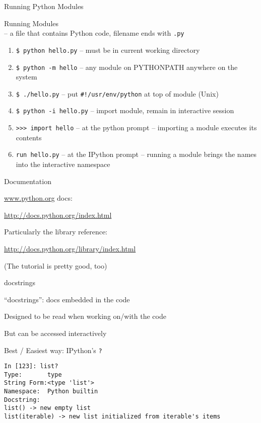 \documentclass{beamer}
\begin{document}
\begin{frame}[fragile]{Running Python Modules}


{\Large Running Modules}\\[0.05in]
-- a file that contains Python code, filename ends with \verb+.py+

 \begin{enumerate}
    \item \verb+$ python hello.py+  -- must be in current working directory

    \item \verb+$ python -m hello+  -- any module on PYTHONPATH anywhere on the system

    \item \verb+$ ./hello.py+       -- put \verb+#!/usr/env/python+ at top of module (Unix)
   
    \item \verb+$ python -i hello.py+  -- import module, remain in interactive session 

    \item \verb+>>> import hello+    -- at the python prompt -- importing a module executes its contents

    \item \verb+run hello.py+    -- at the IPython prompt -- running a module brings the names into the interactive namespace
\end{enumerate}

\end{frame} 

\begin{frame}[fragile]{Documentation}

{\Large \url{www.python.org} docs:}

\url{http://docs.python.org/index.html}

\vspace{0.25in}
{\Large Particularly the library reference:}

\url{http://docs.python.org/library/index.html}

\vspace{0.25in}
(The tutorial is pretty good, too)

\end{frame} 


\begin{frame}[fragile]{docstrings}

{\Large ``docstrings'': docs embedded in the code}

\vfill
{\Large Designed to be read when working on/with the code}

\vfill 
{\Large But can be accessed interactively}

\vfill
{\Large Best / Easiest way: IPython's  \verb+?+}

\begin{verbatim}
In [123]: list?
Type:       type
String Form:<type 'list'>
Namespace:  Python builtin
Docstring:
list() -> new empty list
list(iterable) -> new list initialized from iterable's items
\end{verbatim}

\end{frame} 
\end{document}
